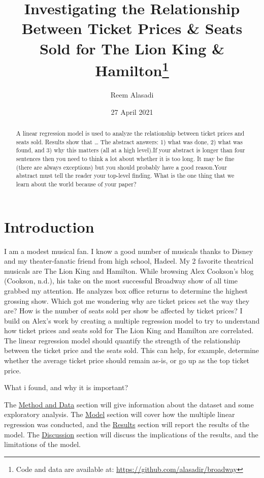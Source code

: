 \documentclass[
]{article}
\title{Investigating the Relationship Between Ticket Prices \& Seats Sold for The Lion King \& Hamilton\thanks{Code and data are available at: \url{https://github.com/alasadir/broadway}}}
\author{Reem Alasadi}
\date{27 April 2021}
\begin{document}
\maketitle
\begin{abstract}
A linear regression model is used to analyze the relationship between ticket prices and seats sold. Results show that \ldots{} The abstract answers: 1) what was done, 2) what was found, and 3) why this matters (all at a high level).If your abstract is longer than four sentences then you need to think a lot about whether it is too long. It may be fine (there are always exceptions) but you should probably have a good reason.Your abstract must tell the reader your top-level finding. What is the one thing that we learn about the world because of your paper?
\end{abstract}

\newpage

\hypertarget{introduction}{%
\section{Introduction}\label{introduction}}

I am a modest musical fan. I know a good number of musicals thanks to Disney and my theater-fanatic friend from high school, Hadeel. My 2 favorite theatrical musicals are The Lion King and Hamilton. While browsing Alex Cookson's blog (Cookson, n.d.), his take on the most successful Broadway show of all time grabbed my attention. He analyzes box office returns to determine the highest grossing show. Which got me wondering why are ticket prices set the way they are? How is the number of seats sold per show be affected by ticket prices? I build on Alex's work by creating a multiple regression model to try to understand how ticket prices and seats sold for The Lion King and Hamilton are correlated. The linear regression model should quantify the strength of the relationship between the ticket price and the seats sold. This can help, for example, determine whether the average ticket price should remain as-is, or go up as the top ticket price.

What i found, and why it is important?

The \protect\hyperlink{Mux5cux26D}{Method and Data} section will give information about the dataset and some exploratory analysis. The \protect\hyperlink{model}{Model} section will cover how the multiple linear regression was conducted, and the \protect\hyperlink{results}{Results} section will report the results of the model. The \protect\hyperlink{discusssion}{Discussion} section will discuss the implications of the results, and the limitations of the model.
\end{document}
